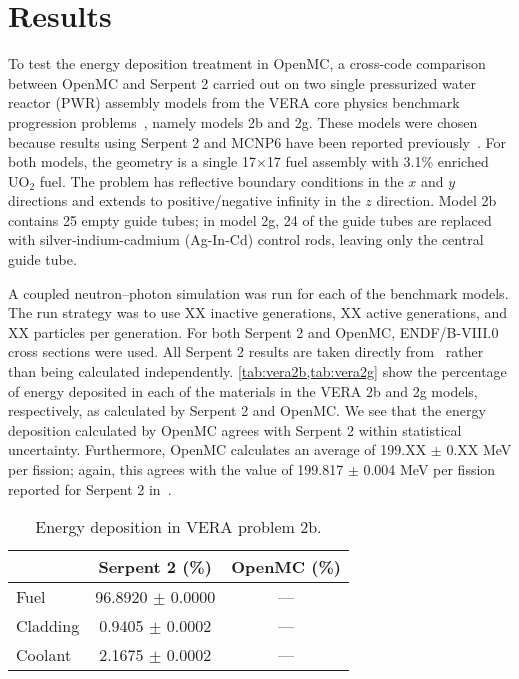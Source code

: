 \documentclass{anstrans}
\begin{document}
\section{Results}

To test the energy deposition treatment in OpenMC, a cross-code comparison
between OpenMC and Serpent 2 carried out on two single pressurized water reactor
(PWR) assembly models from the VERA core physics benchmark progression
problems~\cite{godfrey2014casl}, namely models 2b and 2g. These models were
chosen because results using Serpent 2 and MCNP6 have been reported
previously~\cite{tuominen2019ane}. For both models, the geometry is a single
17$\times$17 fuel assembly with 3.1\% enriched UO$_2$ fuel. The problem has
reflective boundary conditions in the $x$ and $y$ directions and extends to
positive/negative infinity in the $z$ direction. Model 2b contains 25 empty
guide tubes; in model 2g, 24 of the guide tubes are replaced with
silver-indium-cadmium (Ag-In-Cd) control rods, leaving only the central guide
tube.

A coupled neutron--photon simulation was run for each of the benchmark models.
The run strategy was to use XX inactive generations, XX active generations, and
XX particles per generation. For both Serpent 2 and OpenMC, ENDF/B-VIII.0 cross
sections were used. All Serpent 2 results are taken directly
from~\cite{tuominen2019ane} rather than being calculated independently.
\cref{tab:vera2b,tab:vera2g} show the percentage of energy deposited in each of
the materials in the VERA 2b and 2g models, respectively, as calculated by
Serpent 2 and OpenMC. We see that the energy deposition calculated by OpenMC
agrees with Serpent 2 within statistical uncertainty. Furthermore, OpenMC
calculates an average of 199.XX $\pm$ 0.XX MeV per fission; again, this agrees
with the value of 199.817 $\pm$ 0.004 MeV per fission reported for Serpent 2
in~\cite{tuominen2019ane}.
\begin{table}[htbp]
  \centering
  \caption{Energy deposition in VERA problem 2b.}
  \label{tab:vera2b}
  \begin{tabular}{lcc}
    \toprule
    & Serpent 2 (\%) & OpenMC (\%) \\
    \midrule
    Fuel & 96.8920 $\pm$ 0.0000 & --- \\
    Cladding & 0.9405 $\pm$ 0.0002 & --- \\
    Coolant & 2.1675 $\pm$ 0.0002 & --- \\
    \bottomrule
  \end{tabular}
\end{table}
\end{document}
